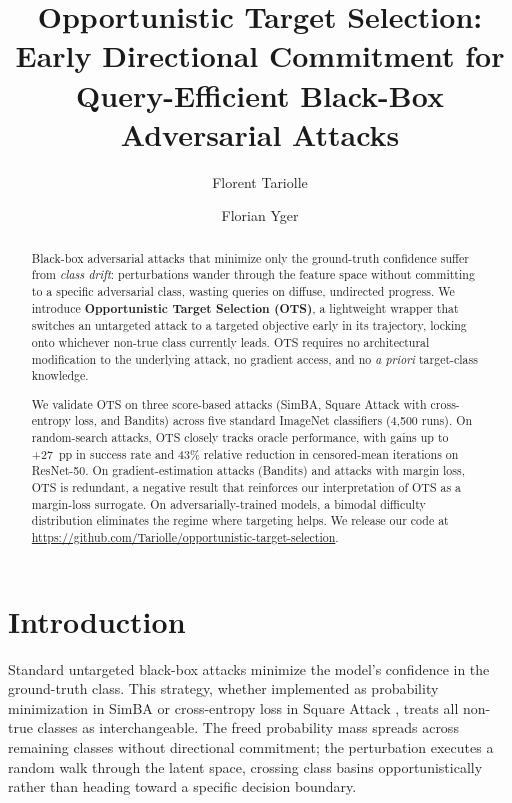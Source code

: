 \documentclass{cap2026}
\title{Opportunistic Target Selection: Early Directional Commitment for Query-Efficient Black-Box Adversarial Attacks}
\author[1]{Florent Tariolle}
\author[1,2]{Florian Yger}
\affil[1]{INSA Rouen Normandy}
\affil[2]{LITIS}
\date{\vspace{-2.5em}}
\begin{document}
\nolinenumbers

\maketitle

\begin{abstract}
Black-box adversarial attacks that minimize only the ground-truth confidence suffer from \textit{class drift}: perturbations wander through the feature space without committing to a specific adversarial class, wasting queries on diffuse, undirected progress. We introduce \textbf{Opportunistic Target Selection (OTS)}, a lightweight wrapper that switches an untargeted attack to a targeted objective early in its trajectory, locking onto whichever non-true class currently leads. OTS requires no architectural modification to the underlying attack, no gradient access, and no \textit{a priori} target-class knowledge.

We validate OTS on three score-based attacks (SimBA, Square Attack with cross-entropy loss, and Bandits) across five standard ImageNet classifiers (4,500 runs). On random-search attacks, OTS closely tracks oracle performance, with gains up to +27~pp in success rate and 43\% relative reduction in censored-mean iterations on ResNet-50. On gradient-estimation attacks (Bandits) and attacks with margin loss, OTS is redundant, a negative result that reinforces our interpretation of OTS as a margin-loss surrogate. On adversarially-trained models, a bimodal difficulty distribution eliminates the regime where targeting helps. We release our code at \url{https://github.com/Tariolle/opportunistic-target-selection}.

\medskip
{}
\end{abstract}

\section{Introduction}\label{sec:introduction}

Standard untargeted black-box attacks minimize the model's confidence in the ground-truth class. This strategy, whether implemented as probability minimization in SimBA \citep{guo2019simple} or cross-entropy loss in Square Attack \citep{andriushchenko2020square}, treats all non-true classes as interchangeable. The freed probability mass spreads across remaining classes without directional commitment; the perturbation executes a random walk through the latent space, crossing class basins opportunistically rather than heading toward a specific decision boundary.
\end{document}
